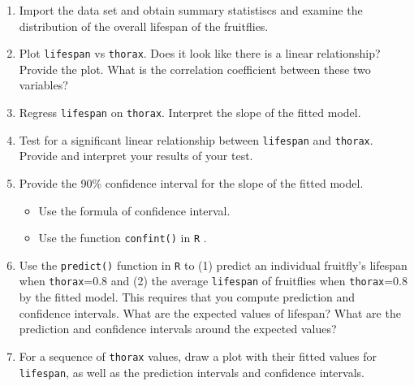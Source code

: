 \documentclass[12pt,letterpaper]{article}
\begin{document}
\begin{enumerate}
	
	\item
	Import the data set and obtain summary statistiscs and examine the distribution of the overall lifespan of the fruitflies.  
	
	\newpage
	\item
	Plot \texttt{lifespan} vs \texttt{thorax}. Does it look like there is a linear relationship? Provide the plot. What is the correlation coefficient between these two variables?
	\vspace{6cm}
	\item
	Regress \texttt{lifespan} on \texttt{thorax}.  Interpret the slope of the fitted model.
	\vspace{6cm}
	\item
	Test for a significant linear relationship between  \texttt{lifespan} and \texttt{thorax}. Provide and interpret your results of your test.
	
	\newpage
	\item
	
	Provide the 90\% confidence interval for the slope of the fitted model.
	
	\vspace{.5cm}
	\begin{itemize}
		\item
		Use the formula of confidence interval.		\vspace{.5cm}
		\item
		Use the function  \texttt{confint()}  in \texttt{R} .
	\end{itemize}
	\vspace{6cm}
	\item Use the \texttt{predict()} function in \texttt{R} to (1) predict an individual fruitfly's lifespan when \texttt{thorax}=0.8 and (2) the average \texttt{lifespan} of fruitflies when \texttt{thorax}=0.8 by the fitted model. This requires that you compute prediction and confidence intervals. What are the expected values of lifespan? What are the prediction and confidence intervals around the expected values? 
	
	\vspace{6cm}
	\item	For a sequence of \texttt{thorax} values, draw a plot with their fitted values for \texttt{lifespan}, as well as the prediction intervals and confidence intervals.
	
	
	
\end{enumerate}
\end{document}
